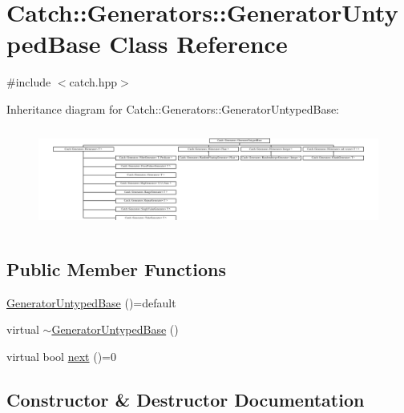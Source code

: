 \hypertarget{class_catch_1_1_generators_1_1_generator_untyped_base}{}\section{Catch\+::Generators\+::Generator\+Untyped\+Base Class Reference}
\label{class_catch_1_1_generators_1_1_generator_untyped_base}


{\ttfamily \#include $<$catch.\+hpp$>$}

Inheritance diagram for Catch\+::Generators\+::Generator\+Untyped\+Base\+:\begin{figure}[H]
\begin{center}
\leavevmode
\includegraphics[height=3.373494cm]{class_catch_1_1_generators_1_1_generator_untyped_base}
\end{center}
\end{figure}
\subsection*{Public Member Functions}
\begin{DoxyCompactItemize}
\item 
\mbox{\hyperlink{class_catch_1_1_generators_1_1_generator_untyped_base_a00ff0179d739c3016756b6cf56fabbad}{Generator\+Untyped\+Base}} ()=default
\item 
virtual \mbox{\hyperlink{class_catch_1_1_generators_1_1_generator_untyped_base_a6f05f8099fdc5744a7aff68aa8c09c7f}{$\sim$\+Generator\+Untyped\+Base}} ()
\item 
virtual bool \mbox{\hyperlink{class_catch_1_1_generators_1_1_generator_untyped_base_aeed3c0cd6233c5f553549e453b8d6638}{next}} ()=0
\end{DoxyCompactItemize}


\subsection{Constructor \& Destructor Documentation}
\mbox{\label{class_catch_1_1_generators_1_1_generator_untyped_base_a00ff0179d739c3016756b6cf56fabbad}} 
